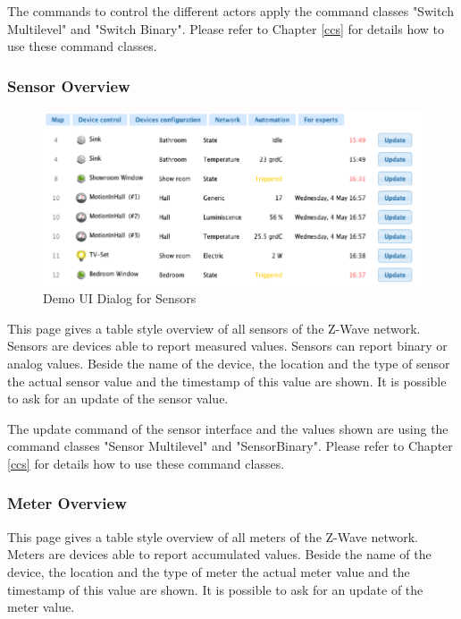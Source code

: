 The commands to control the different actors apply the  command classes "Switch Multilevel" and "Switch 
Binary". Please refer to Chapter \ref{ccs} for details how to use these command classes.


\subsubsection{Sensor Overview}


\begin{figure} 
\begin{center}
\includegraphics[scale=0.5]{pics/sensors.png}
\caption{Demo UI Dialog for Sensors}
\label{c3:demosensor} 
\end{center}
 \end{figure}

 This page gives a table style overview of all sensors of the Z-Wave network.  
Sensors are devices able to report measured values. Sensors can report binary or analog values.  Beside the name of the device, the location and the type of sensor the actual sensor value and the timestamp of this value are shown. It is possible to ask for an update of the sensor value.

 
 
The update command of the sensor interface and  the values shown are using the command classes "Sensor Multilevel" and "SensorBinary". Please refer to Chapter \ref{ccs} for details how to use these command classes.
 
\subsubsection{Meter Overview}

This page gives a table style overview of all meters of the Z-Wave network.  
Meters are devices able to report accumulated values.  Beside the name of the device, the location and the type of meter the actual meter value and the timestamp of this value are shown. It is possible to ask for an update of the meter value.
 
